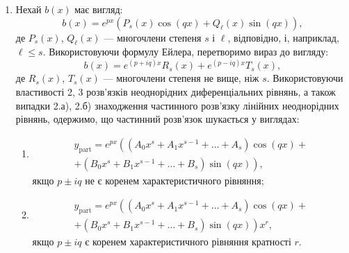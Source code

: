 \begin{enumerate}
	\item Нехай $b(x)$ має вигляд:
	\begin{equation*}
		b(x) = e^{px} \left( P_s(x) \cos (qx) + Q_\ell (x) \sin(q x) \right),
	\end{equation*}
	де $P_s(x)$, $Q_\ell(x)$ --- многочлени степеня $s$ і $\ell$, відповідно, і, наприклад, $\ell \le s$. Використовуючи формулу Ейлера, перетворимо вираз до вигляду:
	\begin{equation*}
		b(x) = e^{(p + i q) x} R_s(x) + e^{(p - i q) x} T_s(x),
	\end{equation*}
	де $R_s(x)$, $T_s(x)$ --- многочлени степеня не вище, ніж $s$. Використовуючи властивості 2, 3 розв'язків неоднорідних диференціальних рівнянь, а також випадки 2.а), 2.б) знаходження частинного розв'язку лінійних неоднорідних рівнянь, одержимо, що частинний розв'язок шукається у виглядах:
 	\begin{enumerate}
 		\item 
 		\begin{multline*}
 			y_{\text{part}} = e^{p x} \left( \left( A_0 x^s + A_1 x^{s - 1} + \ldots + A_s \right) \cos (qx) \right. + \\ + \left. \left( B_0 x^s + B_1 x^{s - 1} + \ldots + B_s \right) \sin (q x) \right),
 		\end{multline*}
		якщо $p \pm i q$ не є коренем характеристичного рівняння;
		\item
		\begin{multline*}
 			y_{\text{part}} = e^{p x} \left( \left( A_0 x^s + A_1 x^{s - 1} + \ldots + A_s \right) \cos (qx) \right. + \\ + \left. \left( B_0 x^s + B_1 x^{s - 1} + \ldots + B_s \right) \sin (q x) \right) x^r,
 		\end{multline*}
 		якщо $p \pm i q$ є коренем характеристичного рівняння кратності $r$.
 	\end{enumerate}
\end{enumerate}